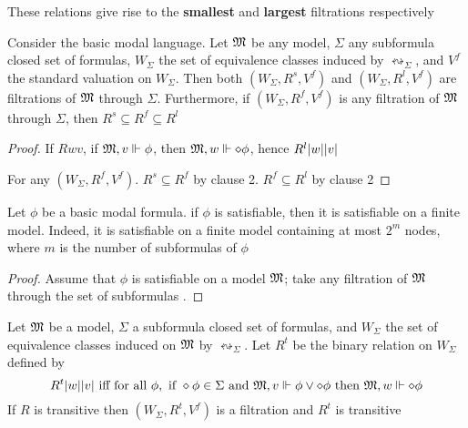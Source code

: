 \documentclass[11pt]{article}
\begin{document}
These relations give rise to the \textbf{smallest} and \textbf{largest} filtrations respectively

\begin{lemma}[]
Consider the basic modal language. Let \(\mathfrak{M}\) be any model, \(\Sigma\) any
subformula closed set of formulas, \(W_\Sigma\) the set of equivalence
classes induced by \(\leftrightsquigarrow_\Sigma\), and \(V^f\) the standard
valuation on \(W_\Sigma\). Then both \((W_\Sigma,R^s,V^f)\) and
\((W_\Sigma,R^l,V^f)\) are filtrations of \(\mathfrak{M}\) through \(\Sigma\). Furthermore, if
\((W_\Sigma, R^f,V^f)\) is any filtration of \(\mathfrak{M}\) through \(\Sigma\), then
\(R^s\subseteq R^f\subseteq R^l\)
\end{lemma}

\begin{proof}
If \(Rwv\), if \(\mathfrak{M},v\Vdash\phi\), then \(\mathfrak{M},w\Vdash\diamond\phi\), hence
\(R^l\abs{w}\abs{v}\)

For any \((W_\Sigma,R^f,V^f)\). \(R^s\subseteq R^f\) by clause 2.
\(R^f\subseteq R^l\) by clause 2
\end{proof}

\begin{theorem}
Let \(\phi\) be a basic modal formula. if \(\phi\) is satisfiable, then it is satisfiable
on a finite model. Indeed, it is satisfiable on a finite model containing at
most \(2^m\) nodes, where \(m\) is the number of subformulas of \(\phi\)
\end{theorem}

\begin{proof}
Assume that \(\phi\) is satisfiable on a model \(\mathfrak{M}\); take any filtration of
\(\mathfrak{M}\) through the set of subformulas .
\end{proof}

\begin{lemma}[]
Let \(\mathfrak{M}\) be a model, \(\Sigma\) a subformula closed set of formulas, and
\(W_\Sigma\) the set of equivalence classes induced on \(\mathfrak{M}\) by
\(\leftrightsquigarrow_\Sigma\). Let \(R^t\) be the binary relation on
\(W_\Sigma\) defined by
\begin{equation*}
R^t\abs{w}\abs{v} \text{ iff for all }\phi, \text{ if }\diamond\phi\in\Sigma
\text{ and }\fM,v\Vdash\phi\vee\diamond\phi\text{ then }\fM,w\Vdash\diamond\phi
\end{equation*}
If \(R\) is transitive then \((W_\Sigma,R^t,V^f)\) is a filtration and
\(R^t\) is transitive
\end{lemma}
\end{document}
